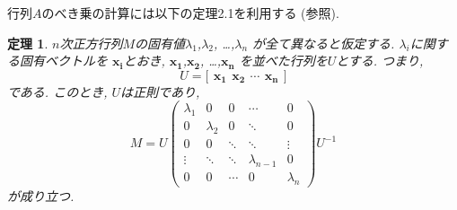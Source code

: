 \documentclass[a4paper,12pt]{jarticle}
\newtheorem{theorem}{定理}[section]
\begin{document}
行列$A$のべき乗の計算には以下の定理2.1を利用する (\cite{k}参照).

\begin{theorem} \label{thm2.1}
$n$次正方行列$M$の固有値$\lambda_1$,$\lambda_2$, \ldots ,$\lambda_n$ が全て異なると仮定する. $\lambda_i$に関する固有ベクトルを
$\bm{x_i}$とおき,  $\bm{x_1}$,$\bm{x_2}$, \ldots ,$\bm{x_n}$ を並べた行列を$U$とする. つまり,
\[U = \Big[ \,\ \bm{x_1} \,\ \bm{x_2} \,\ \cdots \,\ \bm{x_n} \,\ \Big] \]
である. このとき, $U$は正則であり,
\[ M = U \left( \begin{array} {ccccc} 
\lambda_1  & 0 & 0 & \cdots & 0 \\
0 & \lambda_2 & 0 & \ddots & 0 \\
0 & 0 & \ddots & \ddots & \vdots \\
\vdots & \ddots & \ddots & \lambda_{n-1} & 0 \\
0 & 0 & \cdots & 0 & \lambda_{n}  \end{array}\right) U^{-1} \]
が成り立つ.
\end{theorem}
\end{document}
